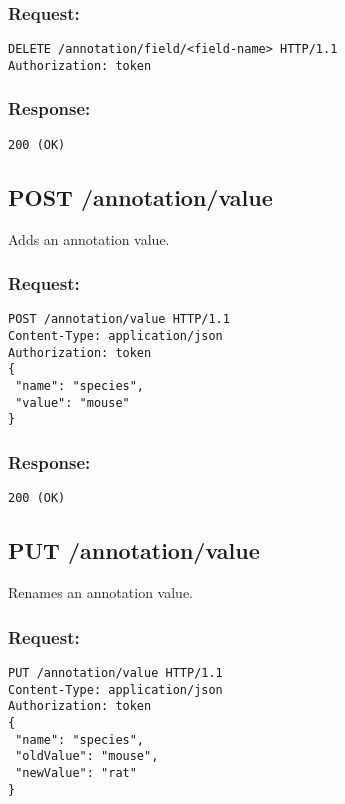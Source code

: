 \subsubsection*{Request:}
\begin{verbatim}
DELETE /annotation/field/<field-name> HTTP/1.1
Authorization: token
\end{verbatim}

\subsubsection*{Response:}
\begin{verbatim}
200 (OK)
\end{verbatim}

\subsection*{POST /annotation/value}

Adds an annotation value.

\subsubsection*{Request:}
\begin{verbatim}
POST /annotation/value HTTP/1.1
Content-Type: application/json
Authorization: token
{
 "name": "species", 
 "value": "mouse"
}
\end{verbatim}

\subsubsection*{Response:}
\begin{verbatim}
200 (OK)
\end{verbatim}

\subsection*{PUT /annotation/value}

Renames an annotation value.

\subsubsection*{Request:}
\begin{verbatim}
PUT /annotation/value HTTP/1.1
Content-Type: application/json
Authorization: token
{
 "name": "species",
 "oldValue": "mouse",
 "newValue": "rat"
}
\end{verbatim}

